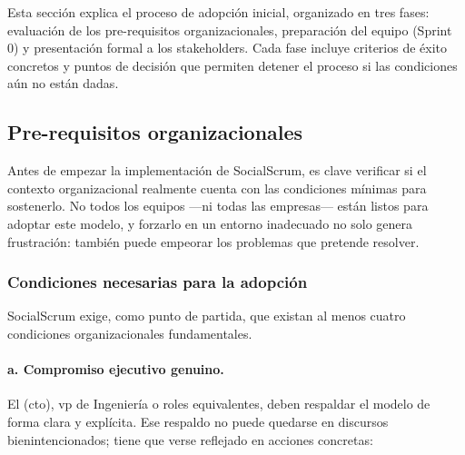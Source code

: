 Esta sección explica el proceso de adopción inicial, organizado en tres fases: evaluación de los pre-requisitos organizacionales, preparación del equipo (Sprint 0) y presentación formal a los \gls{stakeholders}. Cada fase incluye criterios de éxito concretos y puntos de decisión que permiten detener el proceso si las condiciones aún no están dadas.

\subsection{Pre-requisitos organizacionales}
\label{sec:sub-pre-requisitos-organizacionales}

Antes de empezar la implementación de SocialScrum, es clave verificar si el contexto organizacional realmente cuenta con las condiciones mínimas para sostenerlo. No todos los equipos —ni todas las empresas— están listos para adoptar este modelo, y forzarlo en un entorno inadecuado no solo genera frustración: también puede empeorar los problemas que pretende resolver.

\subsubsection{Condiciones necesarias para la adopción}

SocialScrum exige, como punto de partida, que existan al menos cuatro condiciones organizacionales fundamentales.

\paragraph{a. Compromiso ejecutivo genuino.}

El (\acrfull{cto}), \acrfull{vp} de Ingeniería o roles equivalentes, deben respaldar el modelo de forma clara y explícita. Ese respaldo no puede quedarse en discursos bienintencionados; tiene que verse reflejado en acciones concretas:

